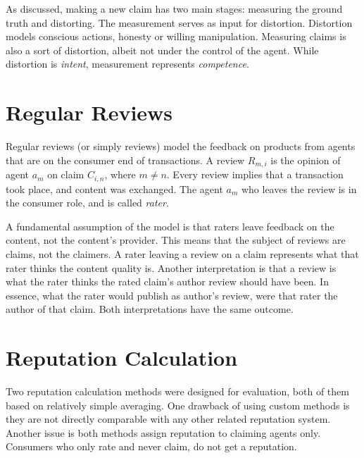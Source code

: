\documentclass[%
    ]{\PathToTumTemplate/thesis/tum_thesis}
\begin{document}
As discussed, making a new claim has two main stages: measuring the ground truth and distorting.
The measurement serves as input for distortion.
Distortion models conscious actions, honesty or willing manipulation.
Measuring claims is also a sort of distortion, albeit not under the control of the agent.
While distortion is \emph{intent}, measurement represents \emph{competence}.



\section{Regular Reviews}\label{sec:approach_reviews}
Regular reviews (or simply reviews) model the feedback on products from agents that are on the consumer end of transactions.
A review $R_{m,i}$ is the opinion of agent $a_m$ on claim $C_{i,n}$, where $m \neq n$.
Every review implies that a transaction took place, and content was exchanged.
The agent $a_m$ who leaves the review is in the consumer role, and is called \emph{rater}.

A fundamental assumption of the model is that raters leave feedback on the content, not the content's provider.
This means that the subject of reviews are claims, not the claimers.
A rater leaving a review on a claim represents what that rater thinks the content quality is.
Another interpretation is that a review is what the rater thinks the rated claim's author review should have been.
In essence, what the rater would publish as author's review, were that rater the author of that claim.
Both interpretations have the same outcome.



\section{Reputation Calculation}\label{sec:approach_reputation_calculation}
Two reputation calculation methods were designed for evaluation, both of them based on relatively simple averaging.
One drawback of using custom methods is they are not directly comparable with any other related reputation system.
Another issue is both methods assign reputation to claiming agents only.
Consumers who only rate and never claim, do not get a reputation.
\end{document}
